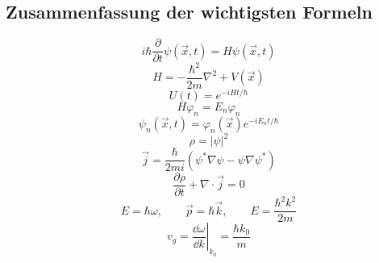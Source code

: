 \subsection{Zusammenfassung der wichtigsten Formeln}

\begin{formulabox}
\[
    i\hbar\frac{\partial}{\partial t}\psi(\vec{x},t)=H\psi(\vec{x},t)
\]
\[
    H=-\frac{\hbar^2}{2m}\nabla^2+V(\vec{x})
\]
\[
    U(t)=e^{-iHt/\hbar}
\]
\[
    H\varphi_n=E_n\varphi_n
\]
\[
    \psi_n(\vec{x},t)=\varphi_n(\vec{x})e^{-iE_nt/\hbar}
\]
\[
    \rho=|\psi|^2
\]
\[
    \vec{j}=\frac{\hbar}{2mi}\left(\psi^*\nabla\psi-\psi\nabla\psi^*\right)
\]
\[
    \frac{\partial\rho}{\partial t}+\nabla\cdot\vec{j}=0
\]
\[
    E=\hbar\omega,
    \qquad
    \vec{p}=\hbar\vec{k},
    \qquad
    E=\frac{\hbar^2k^2}{2m}
\]
\[
    v_g=\left.\frac{\dd\omega}{\dd k}\right|_{k_0}=\frac{\hbar k_0}{m}
\]
\end{formulabox}
